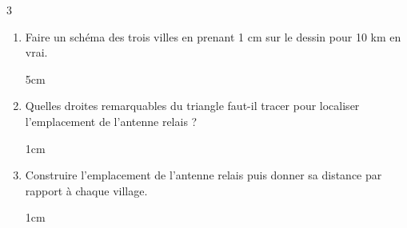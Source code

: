 \documentclass[a4paper]{book}
\begin{document}
{\begin{exerciceNote}{3}
        \bigskip
        
        \begin{enumerate}[leftmargin=*]
            \item Faire un schéma des trois villes en prenant 1 cm sur le dessin pour 10 km en vrai.
            
            \begin{ZoneReponse}{5cm}
            \end{ZoneReponse}
            
            \item Quelles droites remarquables du triangle faut-il tracer pour localiser l'emplacement de l'antenne relais ?
            
            \begin{ZoneReponse}{1cm}
            \end{ZoneReponse}

            \item Construire l'emplacement de l'antenne relais puis donner sa distance par rapport à chaque village.
            
            \begin{ZoneReponse}{1cm}
            \end{ZoneReponse}
        \end{enumerate}
    \end{exerciceNote}

}
\end{document}
